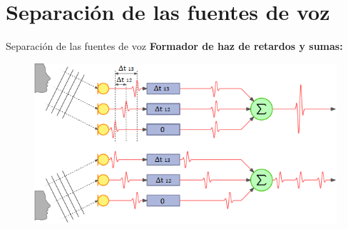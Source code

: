 \documentclass[12pt,aspectratio=169]{beamer}
\begin{document}
%		
	
%		
%	
%		
	
	\section{Separación de las fuentes de voz}
	
	\begin{frame}{Separación de las fuentes de voz}
		\textbf{Formador de haz de retardos y sumas:}\\	
		\vspace{5mm}
		\begin{figure}[h]
			\centering
			\includegraphics[width=0.7\linewidth]{figures/steer}
		\end{figure}
	\end{frame}
	
\end{document}
